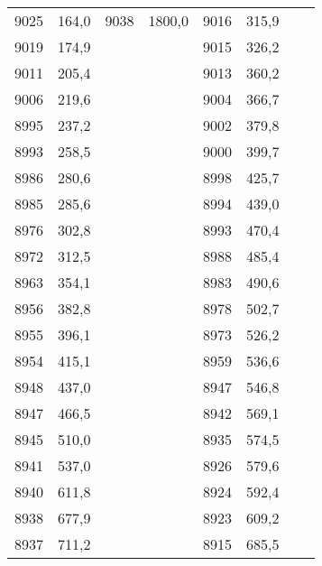 \documentclass[11pt]{article}
\begin{document}
{{\begin{tabular}{|c|c|c|c|c|c|c|c|}
            \cline{1-6} 
            9025 & 164,0 & 9038 & 1800,0 & 9016 & 315,9 &  & \tabularnewline
            \cline{1-6} 
            9019 & 174,9 & \multicolumn{1}{c}{} &  & 9015 & 326,2 &  & \tabularnewline
            \cline{1-2} \cline{5-6} 
            9011 & 205,4 & \multicolumn{1}{c}{} &  & 9013 & 360,2 &  & \tabularnewline
            \cline{1-2} \cline{5-6} 
            9006 & 219,6 & \multicolumn{1}{c}{} &  & 9004 & 366,7 &  & \tabularnewline
            \cline{1-2} \cline{5-6} 
            8995 & 237,2 & \multicolumn{1}{c}{} &  & 9002 & 379,8 &  & \tabularnewline
            \cline{1-2} \cline{5-6} 
            8993 & 258,5 & \multicolumn{1}{c}{} &  & 9000 & 399,7 &  & \tabularnewline
            \cline{1-2} \cline{5-6} 
            8986 & 280,6 & \multicolumn{1}{c}{} &  & 8998 & 425,7 &  & \tabularnewline
            \cline{1-2} \cline{5-6} 
            8985 & 285,6 & \multicolumn{1}{c}{} &  & 8994 & 439,0 &  & \tabularnewline
            \cline{1-2} \cline{5-6} 
            8976 & 302,8 & \multicolumn{1}{c}{} &  & 8993 & 470,4 &  & \tabularnewline
            \cline{1-2} \cline{5-6} 
            8972 & 312,5 & \multicolumn{1}{c}{} &  & 8988 & 485,4 &  & \tabularnewline
            \cline{1-2} \cline{5-6} 
            8963 & 354,1 & \multicolumn{1}{c}{} &  & 8983 & 490,6 &  & \tabularnewline
            \cline{1-2} \cline{5-6} 
            8956 & 382,8 & \multicolumn{1}{c}{} &  & 8978 & 502,7 &  & \tabularnewline
            \cline{1-2} \cline{5-6} 
            8955 & 396,1 & \multicolumn{1}{c}{} &  & 8973 & 526,2 &  & \tabularnewline
            \cline{1-2} \cline{5-6} 
            8954 & 415,1 & \multicolumn{1}{c}{} &  & 8959 & 536,6 &  & \tabularnewline
            \cline{1-2} \cline{5-6} 
            8948 & 437,0 & \multicolumn{1}{c}{} &  & 8947 & 546,8 &  & \tabularnewline
            \cline{1-2} \cline{5-6} 
            8947 & 466,5 & \multicolumn{1}{c}{} &  & 8942 & 569,1 &  & \tabularnewline
            \cline{1-2} \cline{5-6} 
            8945 & 510,0 & \multicolumn{1}{c}{} &  & 8935 & 574,5 &  & \tabularnewline
            \cline{1-2} \cline{5-6} 
            8941 & 537,0 & \multicolumn{1}{c}{} &  & 8926 & 579,6 &  & \tabularnewline
            \cline{1-2} \cline{5-6} 
            8940 & 611,8 & \multicolumn{1}{c}{} &  & 8924 & 592,4 &  & \tabularnewline
            \cline{1-2} \cline{5-6} 
            8938 & 677,9 & \multicolumn{1}{c}{} &  & 8923 & 609,2 &  & \tabularnewline
            \cline{1-2} \cline{5-6} 
            8937 & 711,2 & \multicolumn{1}{c}{} &  & 8915 & 685,5 &  & \tabularnewline
            \cline{1-2} \cline{5-6} 

\end{tabular}}}
\end{document}
